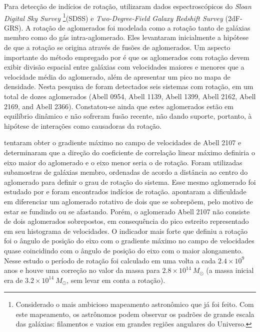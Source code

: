 Para detecção de indícios de rotação,  utilizaram dados espectroscópicos do \textit{Sloan Digital Sky Survey} \footnote{Considerado o mais ambicioso mapeamento astronômico que já foi feito. Com este mapeamento, os astrônomos podem observar os padrões de grande escala das galáxias: filamentos e vazios em grandes regiões angulares do Universo.}(SDSS) e \textit{Two-Degree-Field Galaxy Redshift Survey} (2dF-GRS). A rotação de aglomerados foi modelada como a rotação tanto de galáxias membro como do gás intra-aglomerado. Eles levantaram inicialmente a hipótese de que a rotação se origina através de fusões de aglomerados. Um aspecto importante do método empregado por  é que os aglomerados com rotação devem exibir divisão espacial entre galáxias com velocidades maiores e menores que a velocidade média do aglomerado, além de apresentar um pico no mapa de densidade. Nesta pesquisa de  foram detectados seis sistemas com rotação, em um total de dozes aglomerados (Abell 0954, Abell 1139, Abell 1399, Abell 2162, Abell 2169, and Abell 2366). Constatou-se ainda que estes aglomerados estão em equilíbrio dinâmico e não sofreram fusão recente, não dando suporte, portanto, à hipótese de interações como causadoras da rotação. 

 tentaram obter o gradiente máximo no campo de velocidades de Abell 2107 e determinaram que a direção do coeficiente de correlação linear máximo definiria o eixo maior do aglomerado e o eixo menor seria o de rotação. Foram utilizadas subamostras de galáxias membro, ordenadas de acordo a distância ao centro do aglomerado para definir o grau de rotação do sistema. Esse mesmo aglomerado foi estudado por  e foram encontrados indícios de rotação.  apontaram a dificuldade em diferenciar um aglomerado rotativo de dois que se sobrepõem, pelo motivo de estar se fundindo ou se afastando. Porém, o aglomerado  Abell 2107 não consiste de dois aglomerados sobrepostos, em consequência do pico estreito representado em seu histograma de velocidades. O indicador mais forte que definiu a rotação foi o ângulo de posição do eixo com o gradiente máximo no campo de velocidades quase coincidindo com o ângulo de posição do eixo com o maior alongamento.  Nesse estudo o período de rotação foi calculado em uma volta a cada $2.4\times10^9$ anos e houve uma correção no valor da massa para $2.8\times10^{14}~{M_\odot}$  (a massa inicial era de $3.2\times10^{14}~{M_\odot}$, sem levar em conta a rotação). 

